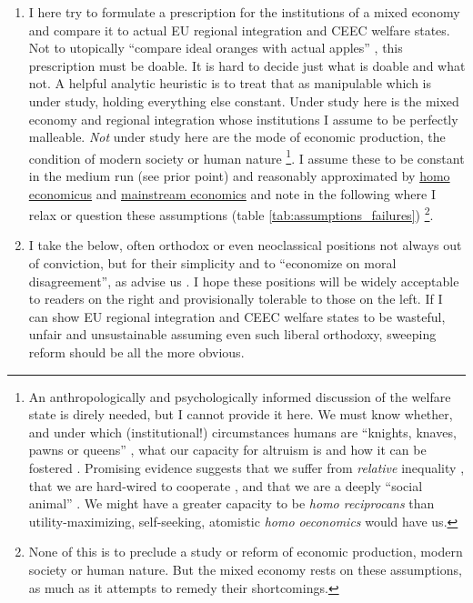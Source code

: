 \documentclass[11pt,a4paper,oneside,openright]{article}
\begin{document}
\begin{enumerate}
\begin{enumerate}
		\item I here try to formulate a prescription for the institutions of a mixed economy and compare it to actual \gls{EU} regional integration and \gls{CEEC} welfare states. 
		Not to utopically ``compare ideal oranges with actual apples'' \citep[84]{Dahl-1989-aa}, this prescription must be doable. 
		It is hard to decide just what is doable and what not. 
		A helpful analytic heuristic is to treat that as manipulable which is under study, holding everything else constant. 
		Under study here is the mixed economy and regional integration whose institutions I assume to be perfectly malleable. 
		\emph{Not} under study here are the mode of economic production, the condition of modern society or human nature
			\footnote{
				An anthropologically and psychologically informed discussion of the welfare state is direly needed, but I cannot provide it here. 
				We must know whether, and under which (institutional!) circumstances humans are ``knights, knaves, pawns or queens'' \citep{LeGrand2003}, what our capacity for altruism is \citep{Henrich2007} and how it can be fostered \citep{Axelrod1981a}. 
				Promising evidence suggests that we suffer from \emph{relative} inequality \citep{Pickett-2009-kx}, that we are hard-wired to cooperate \citep{Zak2011}, and that we are a deeply ``social animal'' \citep{Brooks2011}. 
				We might have a greater capacity to be \emph{homo reciprocans} than utility-maximizing, self-seeking, atomistic \emph{homo oeconomics} would have us.
			}.
		I assume these to be constant in the medium run (see prior point) and reasonably approximated by \hyperref[it:homo_economicus]{homo economicus} and \hyperref[sec:perfect_competition]{mainstream economics} and note in the following where I relax or question these assumptions (table \ref{tab:assumptions_failures})
		\footnote{
			None of this is to preclude a study or reform of economic production, modern society or human nature. 
			But the mixed economy rests on these assumptions, as much as it attempts to remedy their shortcomings.
		}. 
		
		\item {} \label{it:economize_moral} I take the below, often orthodox or even neoclassical positions not always out of conviction, but for their simplicity and to ``economize on moral disagreement'', as \citeauthor{GutmannThompson-2004-aa} advise us \citeyearpar[7, K226]{GutmannThompson-2004-aa}. 
		I hope these positions will be widely acceptable to readers on the right and provisionally tolerable to those on the left. 
		If I can show \gls{EU} regional integration and \gls{CEEC} welfare states to be wasteful, unfair and unsustainable assuming even such liberal orthodoxy, sweeping reform should be all the more obvious.
		
		
	\end{enumerate}
\end{enumerate}
\end{document}
